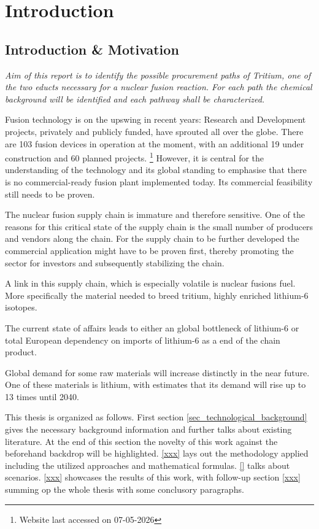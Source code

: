 \chapter{Introduction} 
\label{chap_introduction}
\section{Introduction \& Motivation} 
\label{sec_introduction_motivation}
\begin{center}
   \textit{Aim of this report is to identify the possible procurement paths of Tritium, one of the two educts necessary for a nuclear fusion reaction. For each path the chemical background will be identified and each pathway shall be characterized.}\\
\end{center}

Fusion technology is on the upswing in recent years: Research and Development projects, privately and
publicly funded, have sprouted all over the globe. There are 103 fusion devices in operation at the 
moment, with an additional 19 under construction and 60 planned projects.
\footnote{Website last accessed on 07-05-2026} \cite{IAEA_FFDB_2025}
However, it is central for the understanding of the technology and its global standing to emphasise that 
there is no commercial-ready fusion plant implemented today. Its commercial feasibility still needs to 
be proven. \cite{wimmersNuclearPowerTechnology2026} %

The nuclear fusion supply chain is immature and therefore sensitive. \cite{wimmersNuclearPowerTechnology2026} %
One of the reasons for this critical state of the supply chain is the small number of producers and vendors along the chain. For the supply chain to be further developed the commercial application might have to be proven first, thereby promoting the sector for investors and subsequently stabilizing the chain.  \cite{wimmersNuclearPowerTechnology2026} %

A link in this supply chain, which is especially volatile is nuclear fusions fuel. More specifically the material needed to breed tritium, highly enriched lithium-6 isotopes.

The current state of affairs leads to either an global bottleneck of lithium-6 or total European dependency on imports of lithium-6 as a end of the chain product.

Global demand for some raw materials will increase distinctly in the near future. One of these materials is lithium, with estimates that its demand will rise up to 13 times until 2040. \cite{colucciCombinedAssessmentMaterial2025}

This thesis is organized as follows. First section \ref{sec_technological_background} gives the necessary background information and further talks about existing literature. At the end of this section the novelty of this work against the beforehand backdrop will be highlighted. 
\ref{xxx} lays out the methodology applied including the utilized approaches and mathematical formulas. 
\ref{} talks about scenarios. 
\ref{xxx} showcases the results of this work, with follow-up section \ref{xxx} summing op the whole thesis with some conclusory paragraphs.  